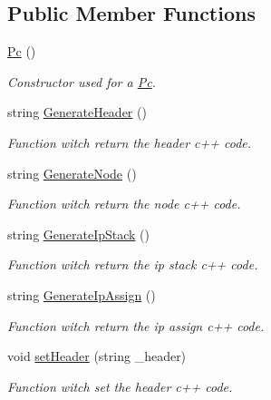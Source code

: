 \subsection*{Public Member Functions}
\begin{CompactItemize}
\item 
\hyperlink{class_pc_ef7314496cee3c1bd2c329aac4dc4f21}{Pc} ()
\begin{CompactList}\small\item\em Constructor used for a \hyperlink{class_pc}{Pc}. \item\end{CompactList}\item 
string \hyperlink{class_pc_a84eb29bce881921ec8f591dfd5b8ba0}{GenerateHeader} ()
\begin{CompactList}\small\item\em Function witch return the header c++ code. \item\end{CompactList}\item 
string \hyperlink{class_pc_e72f59f25f046967f021e56a90281d77}{GenerateNode} ()
\begin{CompactList}\small\item\em Function witch return the node c++ code. \item\end{CompactList}\item 
string \hyperlink{class_pc_205240ed7c68ad780ff4a669376c04eb}{GenerateIpStack} ()
\begin{CompactList}\small\item\em Function witch return the ip stack c++ code. \item\end{CompactList}\item 
string \hyperlink{class_pc_b743fd5f5d74f1d5db9549aa43fab9c5}{GenerateIpAssign} ()
\begin{CompactList}\small\item\em Function witch return the ip assign c++ code. \item\end{CompactList}\item 
void \hyperlink{class_pc_45386d5f2837f3d2087fe62ca1692883}{setHeader} (string \_\-header)
\begin{CompactList}\small\item\em Function witch set the header c++ code. \item\end{CompactList}\end{CompactItemize}


